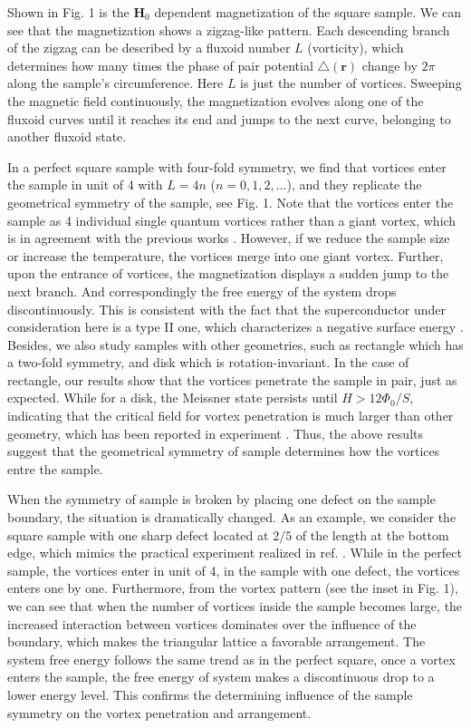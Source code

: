 \documentclass[aps,prl,showpacs,twocolumn]{revtex4}
\begin{document}
Shown in Fig. 1 is the $\textbf{H}_0$ dependent magnetization of the
square sample. We can see that the magnetization shows a zigzag-like
pattern. Each descending branch of the zigzag can be described by a
fluxoid number $L$ (vorticity), which determines how many times the
phase of pair potential $\triangle(\textbf{r})$ change by $2\pi$
along the sample's circumference. Here $L$ is just the number of
vortices. Sweeping the magnetic field continuously, the
magnetization evolves along one of the fluxoid curves until it
reaches its end and jumps to the next curve, belonging to another
fluxoid state.

In a perfect square sample with four-fold symmetry, we find that
vortices enter the sample in unit of 4 with $L=4n$ ($n=0,1,2,...$),
and they replicate the geometrical symmetry of the sample, see Fig.
1. Note that the vortices enter the sample as 4 individual single
quantum vortices rather than a giant vortex, which is in agreement
with the previous works \cite{suematsu,kim}. However, if we reduce
the sample size or increase the temperature, the vortices merge into
one giant vortex. Further, upon the entrance of vortices, the
magnetization displays a sudden jump to the next branch. And
correspondingly the free energy of the system drops discontinuously.
This is consistent with the fact that the superconductor under
consideration here is a type II one, which characterizes a negative
surface energy \cite{bonca}. Besides, we also study samples with
other geometries, such as rectangle which has a two-fold symmetry,
and disk which is rotation-invariant. In the case of rectangle, our
results show that the vortices penetrate the sample in pair, just as
expected. While for a disk, the Meissner state persists until
$H>12\Phi_0/S$, indicating that the critical field for vortex
penetration is much larger than other geometry, which has been
reported in experiment \cite{geim1}. Thus, the above results suggest
that the geometrical symmetry of sample determines how the vortices
entre the sample.

When the symmetry of sample is broken by placing one defect on the
sample boundary, the situation is dramatically changed. As an
example, we consider the square sample with one sharp defect located
at $2/5$ of the length at the bottom edge, which mimics the
practical experiment realized in ref. \cite{geim1}. While in the
perfect sample, the vortices enter in unit of 4, in the sample with
one defect, the vortices enters one by one. Furthermore, from the
vortex pattern (see the inset in Fig. 1), we can see that when the
number of vortices inside the sample becomes large, the increased
interaction between vortices dominates over the influence of the
boundary, which makes the triangular lattice a favorable
arrangement. The system free energy follows the same trend as in the
perfect square, once a vortex enters the sample, the free energy of
system makes a discontinuous drop to a lower energy level. This
confirms the determining influence of the sample symmetry on the
vortex penetration and arrangement.
\end{document}
